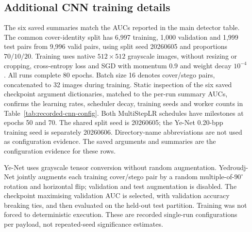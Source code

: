 \documentclass[journal]{IEEEtran}
\theoremstyle{definition}
\theoremstyle{game}
\begin{document}
\subsection{Additional CNN training details}
\label{subsec:repro-cnn}
The six saved summaries match the AUCs reported in the main detector
table. The common cover-identity split has 6,997 training, 1,000
validation and 1,999 test pairs from 9,996 valid pairs, using split
seed 20260605 and proportions $70/10/20$. Training uses native
$512\times512$ grayscale images, without resizing or cropping,
cross-entropy loss and SGD with momentum $0.9$ and weight decay
$10^{-4}$. All runs complete 80 epochs. Batch size 16 denotes
cover/stego pairs, concatenated to 32 images during training.
Static inspection of the six saved checkpoint argument dictionaries,
matched to the per-run summary AUCs, confirms the learning rates,
scheduler decay, training seeds and worker counts in
Table~\ref{tab:recorded-cnn-config}. Both MultiStepLR schedules have
milestones at epochs 50 and 70. The shared split seed is 20260605;
the Ye-Net 0.20-bpp training seed is separately 20260606. Directory-name
abbreviations are not used as configuration evidence. The saved arguments and summaries are the configuration evidence for
these rows.

Ye-Net uses grayscale tensor conversion without random augmentation.
Yedroudj-Net jointly augments each training cover/stego pair by a random
multiple-of-$90^\circ$ rotation and horizontal flip; validation and test
augmentation is disabled. The checkpoint maximising validation AUC is
selected, with validation accuracy breaking ties, and then evaluated on
the held-out test partition. Training was not forced to deterministic
execution. These are recorded single-run configurations per payload,
not repeated-seed significance estimates.
\end{document}
